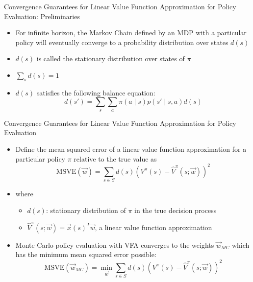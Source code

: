 \documentclass[aspectratio=169]{../latex_main/tntbeamer}  %
\begin{document}
\begin{frame}[c]{Convergence Guarantees for Linear Value Function	Approximation for Policy Evaluation: Preliminaries}
	
	\begin{itemize}
		\item For infinite horizon, the Markov Chain defined by an MDP with a particular policy will eventually converge to a probability distribution over states $d(s)$
		\item $d(s)$ is called the stationary distribution over states of $\pi$
		\item $\sum_{s} d(s) = 1$
		\item $d(s)$ satisfies the following balance equation:
		$$ d(s') = \sum_{s} \sum_{a} \pi(a \mid s) p(s' \mid s,a) d(s) $$
	\end{itemize}
	
\end{frame}
\begin{frame}[c]{Convergence Guarantees for Linear Value Function
		Approximation for Policy Evaluation }
	
	\begin{itemize}
		\item Define the mean squared error of a linear value function approximation for a particular policy $\pi$  relative to the true value as 
		$$\text{MSVE}(\vec{w}) = \sum_{s \in S} d(s) (V^\pi (s) - \hat{V}^\pi(s;\vec{w}))^2 $$
		\item where
		\begin{itemize}
			\item $d(s)$: stationary distribution of $\pi$ in the true decision process
			\item $\hat{V}^\pi(s;\vec{w}) = \vec{x}(s)^T\vec{w}$, a linear value function approximation
		\end{itemize}
		\item Monte Carlo policy evaluation with VFA converges to the weights $\vec{w}_{MC}$ which has the minimum mean squared error possible:
		$$\text{MSVE}(\vec{w}_{MC}) = \min_{\vec{w}}\sum_{s \in S} d(s) (V^\pi (s) - \hat{V}^\pi(s;\vec{w}))^2 $$
	\end{itemize}
	
\end{frame}
\end{document}
